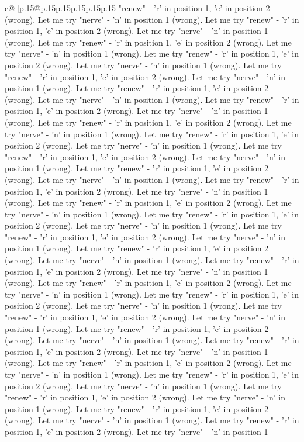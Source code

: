 \documentclass{article}
\begin{document}
{\begin{supertabular}{c@{$\;$}|p{.15\linewidth}@{}p{.15\linewidth}p{.15\linewidth}p{.15\linewidth}p{.15\linewidth}p{.15\linewidth}}
{{{"renew" {-} 'r' in position 1, 'e' in position 2 (wrong). Let me try "nerve" {-} 'n' in position 1 (wrong). Let me try "renew" {-} 'r' in position 1, 'e' in position 2 (wrong). Let me try "nerve" {-} 'n' in position 1 (wrong). Let me try "renew" {-} 'r' in position 1, 'e' in position 2 (wrong). Let me try "nerve" {-} 'n' in position 1 (wrong). Let me try "renew" {-} 'r' in position 1, 'e' in position 2 (wrong). Let me try "nerve" {-} 'n' in position 1 (wrong). Let me try "renew" {-} 'r' in position 1, 'e' in position 2 (wrong). Let me try "nerve" {-} 'n' in position 1 (wrong). Let me try "renew" {-} 'r' in position 1, 'e' in position 2 (wrong). Let me try "nerve" {-} 'n' in position 1 (wrong). Let me try "renew" {-} 'r' in position 1, 'e' in position 2 (wrong). Let me try "nerve" {-} 'n' in position 1 (wrong). Let me try "renew" {-} 'r' in position 1, 'e' in position 2 (wrong). Let me try "nerve" {-} 'n' in position 1 (wrong). Let me try "renew" {-} 'r' in position 1, 'e' in position 2 (wrong). Let me try "nerve" {-} 'n' in position 1 (wrong). Let me try "renew" {-} 'r' in position 1, 'e' in position 2 (wrong). Let me try "nerve" {-} 'n' in position 1 (wrong). Let me try "renew" {-} 'r' in position 1, 'e' in position 2 (wrong). Let me try "nerve" {-} 'n' in position 1 (wrong). Let me try "renew" {-} 'r' in position 1, 'e' in position 2 (wrong). Let me try "nerve" {-} 'n' in position 1 (wrong). Let me try "renew" {-} 'r' in position 1, 'e' in position 2 (wrong). Let me try "nerve" {-} 'n' in position 1 (wrong). Let me try "renew" {-} 'r' in position 1, 'e' in position 2 (wrong). Let me try "nerve" {-} 'n' in position 1 (wrong). Let me try "renew" {-} 'r' in position 1, 'e' in position 2 (wrong). Let me try "nerve" {-} 'n' in position 1 (wrong). Let me try "renew" {-} 'r' in position 1, 'e' in position 2 (wrong). Let me try "nerve" {-} 'n' in position 1 (wrong). Let me try "renew" {-} 'r' in position 1, 'e' in position 2 (wrong). Let me try "nerve" {-} 'n' in position 1 (wrong). Let me try "renew" {-} 'r' in position 1, 'e' in position 2 (wrong). Let me try "nerve" {-} 'n' in position 1 (wrong). Let me try "renew" {-} 'r' in position 1, 'e' in position 2 (wrong). Let me try "nerve" {-} 'n' in position 1 (wrong). Let me try "renew" {-} 'r' in position 1, 'e' in position 2 (wrong). Let me try "nerve" {-} 'n' in position 1 (wrong). Let me try "renew" {-} 'r' in position 1, 'e' in position 2 (wrong). Let me try "nerve" {-} 'n' in position 1 (wrong). Let me try "renew" {-} 'r' in position 1, 'e' in position 2 (wrong). Let me try "nerve" {-} 'n' in position 1 (wrong). Let me try "renew" {-} 'r' in position 1, 'e' in position 2 (wrong). Let me try "nerve" {-} 'n' in position 1 (wrong). Let me try "renew" {-} 'r' in position 1, 'e' in position 2 (wrong). Let me try "nerve" {-} 'n' in position 1 (wrong). Let me try "renew" {-} 'r' in position 1, 'e' in position 2 (wrong). Let me try "nerve" {-} 'n' in position 1 (wrong). Let me try "renew" {-} 'r' in position 1, 'e' in position 2 (wrong). Let me try "nerve" {-} 'n' in position 1 (wrong). Let me try "renew" {-} 'r' in position 1, 'e' in position 2 (wrong). Let me try "nerve" {-} 'n' in position 1 }}}
\end{supertabular}}
\end{document}
